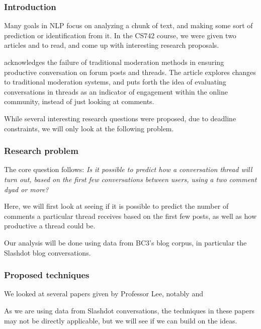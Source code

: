 \documentclass[a4paper,12pt]{article}
\numberwithin{equation}{section}
\begin{document}
 

\subsubsection*{Introduction}

Many goals in NLP focus on analyzing a chunk of text, and making some sort of prediction or identification from it. In the CS742 course, we were given two articles \cite{dejareview} and \cite{anae} to read, and come up with interesting research proposals. 

\cite{anae} acknowledges the failure of traditional moderation methods in ensuring productive conversation on forum posts and threads. The article explores changes to traditional moderation systems, and puts forth the idea of evaluating conversations in threads as an indicator of engagement within the online community, instead of just looking at comments.

While several interesting research questions were proposed, due to deadline constraints, we will only look at the following problem.

\subsubsection*{Research problem}

The core question follows: {\it Is it possible to predict how a conversation thread will turn out, based on the first few conversations between users, using a two comment dyad or more?}

Here, we will first look at seeing if it is possible to predict the number of comments a particular thread receives based on the first few posts, as well as how productive a thread could be.

Our analysis will be done using data from BC3's blog corpus, in particular the Slashdot blog conversations.

\subsubsection*{Proposed techniques}

We looked at several papers given by Professor Lee, notably \cite{Backstrom+al:13a} and 



As we are using data from Slashdot conversations, the techniques in these papers may not be directly applicable, but we will see if we can build on the ideas.
\end{document}

